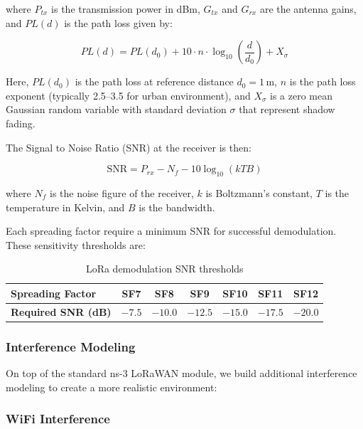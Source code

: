 \documentclass[12pt,a4paper]{article}
\begin{document}
where $P_{tx}$ is the transmission power in dBm, $G_{tx}$ and $G_{rx}$ are the antenna gains, and $PL(d)$ is the path loss given by:

\begin{equation}
    PL(d) = PL(d_0) + 10 \cdot n \cdot \log_{10}\left(\frac{d}{d_0}\right) + X_{\sigma}
    \label{eq:path_loss}
\end{equation}

Here, $PL(d_0)$ is the path loss at reference distance $d_0 = 1$\,m, $n$ is the path loss exponent (typically 2.5--3.5 for urban environment), and $X_{\sigma}$ is a zero mean Gaussian random variable with standard deviation $\sigma$ that represent shadow fading.

The Signal to Noise Ratio (SNR) at the receiver is then:

\begin{equation}
    \text{SNR} = P_{rx} - N_f - 10\log_{10}(kTB)
    \label{eq:snr}
\end{equation}

where $N_f$ is the noise figure of the receiver, $k$ is Boltzmann's constant, $T$ is the temperature in Kelvin, and $B$ is the bandwidth.

Each spreading factor require a minimum SNR for successful demodulation. These sensitivity thresholds are:

\begin{table}[H]
\centering
\caption{LoRa demodulation SNR thresholds}
\label{tab:snr_thresholds}
\begin{tabular}{@{}lcccccc@{}}
\toprule
\textbf{Spreading Factor} & SF7 & SF8 & SF9 & SF10 & SF11 & SF12 \\
\midrule
\textbf{Required SNR (dB)} & $-7.5$ & $-10.0$ & $-12.5$ & $-15.0$ & $-17.5$ & $-20.0$ \\
\bottomrule
\end{tabular}
\end{table}

\subsubsection{Interference Modeling}

On top of the standard ns-3 LoRaWAN module, we build additional interference modeling to create a more realistic environment:

\subsubsection{WiFi Interference}
\end{document}
